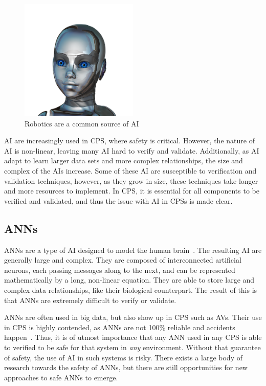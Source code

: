 \begin{figure}[t]
	\centering
	\includegraphics[width=0.5\textwidth]{Content/fig/ai-girl.png}
	\caption{Robotics are a common source of \ac{AI} \label{fig:ai-girl}}
\end{figure}

\ac{AI} are increasingly used in \ac{CPS}, where safety is critical.
However, the nature of \ac{AI} is non-linear, leaving many \ac{AI} hard to verify and validate.
Additionally, as \ac{AI} adapt to learn larger data sets and more complex relationships, the size and complex of the \acp{AI} increase.
Some of these \ac{AI} are susceptible to verification and validation techniques, however, as they grow in size, these techniques take longer and more resources to implement.
In \ac{CPS}, it is essential for all components to be verified and validated, and thus the issue with \ac{AI} in \acp{CPS} is made clear.

\subsection{\acfp{ANN}}
\acp{ANN} are a type of \ac{AI} designed to model the human brain~\cite{kohonen1988introduction}.
The resulting \ac{AI} are generally large and complex.
They are composed of interconnected artificial neurons, each passing messages along to the next, and can be represented mathematically by a long, non-linear equation.
They are able to store large and complex data relationships, like their biological counterpart.
The result of this is that \acp{ANN} are extremely difficult to verify or validate.

\acp{ANN} are often used in big data, but also show up in \ac{CPS} such as \acfp{AV}.
Their use in \ac{CPS} is highly contended, as \acp{ANN} are not 100\% reliable and accidents happen~\cite{coldewey_2018}.
Thus, it is of utmost importance that any \ac{ANN} used in any \ac{CPS} is able to verified to be safe for that system in \textit{any} environment.
Without that guarantee of safety, the use of \ac{AI} in such systems is risky.
There exists a large body of research towards the safety of \acp{ANN}, but there are still opportunities for new approaches to safe \acp{ANN} to emerge.

